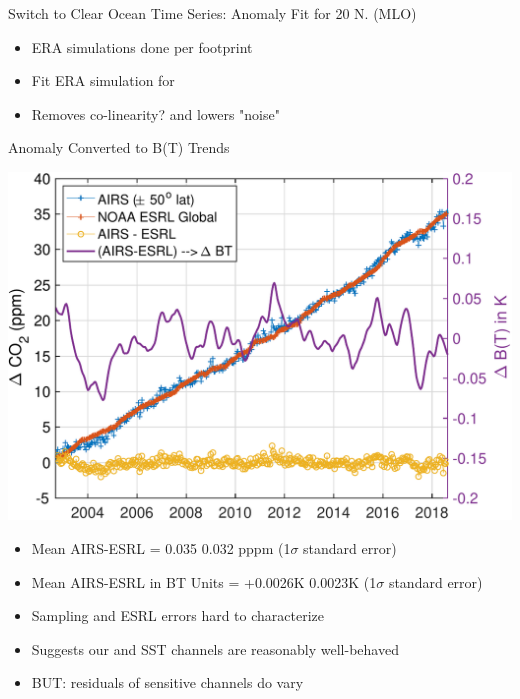 \documentclass[10pt,t]{beamer}
\begin{document}
\begin{frame}[label={sec:org09faf44}]{\small Switch to Clear Ocean Time Series: \cd Anomaly Fit for 20\textdegree{} N. (MLO)}
\begin{footnotesize}
\begin{itemize}
\item ERA simulations done per footprint
\item Fit ERA simulation for \cd
\item Removes co-linearity? and lowers "noise"
\end{itemize}
\end{footnotesize}
\end{frame}

\begin{frame}[label={sec:org5860624}]{\cd Anomaly Converted to B(T) Trends}
\begin{center}
\includegraphics[width=0.7\linewidth]{./Figs/Pdf/co2_airs_vs_esrl_global_with_dbt.pdf}
\end{center}

\vspace{-0.1in}
\begin{footnotesize}
\begin{itemize}
\item Mean AIRS-ESRL \cd = 0.035 \textpm{} 0.032  pppm (1\(\sigma\) standard error)
\item Mean AIRS-ESRL in BT Units = +0.0026K \textpm{} 0.0023K (1\(\sigma\) standard error)
\item Sampling and ESRL errors hard to characterize
\item Suggests our \cd and SST channels are reasonably well-behaved
\item BUT: residuals of \cd sensitive channels do vary
\end{itemize}
\end{footnotesize}
\end{frame}
\end{document}
